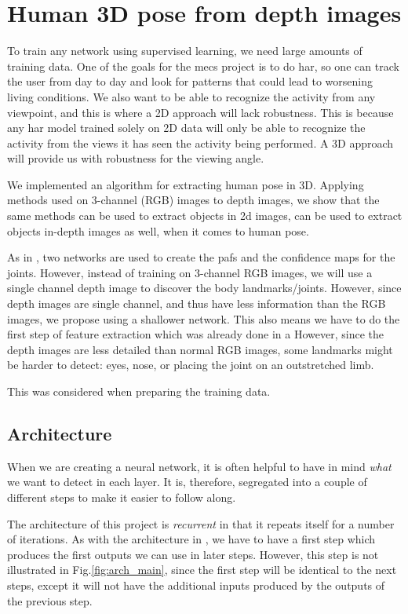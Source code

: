 \chapter{Human 3D pose from depth images}

To train any network using supervised learning, we need large amounts of training data. One of the goals for the \gls{mecs} project is to do \gls{har}, so one can track the user from day to day and look for patterns that could lead to worsening living conditions. We also want to be able to recognize the activity from any viewpoint, and this is where a 2D approach will lack robustness. This is because any \gls{har} model trained solely on 2D data will only be able to recognize the activity from the views it has seen the activity being performed. A 3D approach will provide us with robustness for the viewing angle.

We implemented an algorithm for extracting human pose in 3D.
Applying methods used on 3-channel (RGB) images to depth images, we show that the same methods can be used to extract objects in 2d images, can be used to extract objects in-depth images as well, when it comes to human pose.

As in \cite{cao2017realtime}, two networks are used to create the \gls{paf}s and the confidence maps for the joints. However, instead of training on 3-channel RGB images, we will use a single channel depth image to discover the body landmarks/joints.
However, since depth images are single channel, and thus have less information than the RGB images, we propose using a shallower network. This also means we have to do the first step of feature extraction which was already done in a
However, since the depth images are less detailed than normal RGB images, some landmarks might be harder to detect: eyes, nose, or placing the joint on an outstretched limb.

This was considered when preparing the training data.

\section{Architecture}
When we are creating a neural network, it is often helpful to have in mind \emph{what} we want to detect in each layer. It is, therefore, segregated into a couple of different steps to make it easier to follow along.

The architecture of this project is \emph{recurrent} in that it repeats itself for a number of iterations. As with the architecture in \cite{cao2017realtime}, we have to have a first step which produces the first outputs we can use in later steps. However, this step is not illustrated in Fig.\ref{fig:arch_main}, since the first step will be identical to the next steps, except it will not have the additional inputs produced by the outputs of the previous step.

